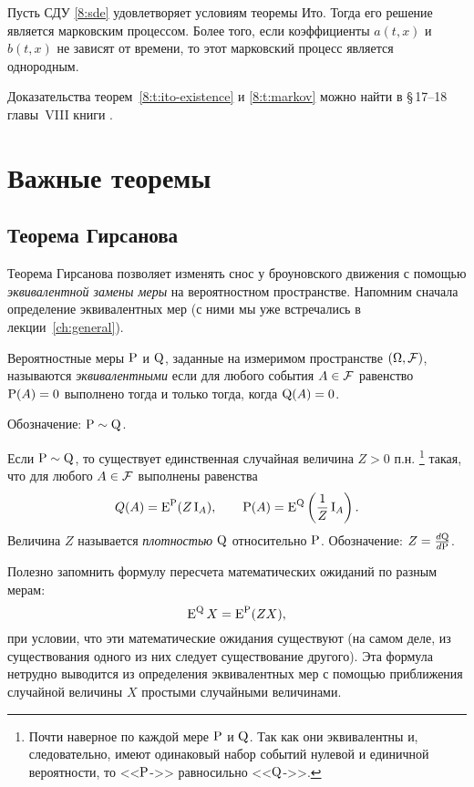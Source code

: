\begin{theorem}
\label{8:t:markov}
Пусть СДУ \eqref{8:sde} удовлетворяет условиям теоремы Ито.
Тогда его решение является марковским процессом.
Более того, если коэффициенты $a(t,x)$ и $b(t,x)$ не зависят от времени, то этот марковский процесс является однородным.
\end{theorem}

\noindent
Доказательства теорем~\ref{8:t:ito-existence} и \ref{8:t:markov} можно найти в \S\,17--18 главы~VIII книги \cite{BulinskiShiryaev04}.


\section{Важные теоремы}

\subsection{Теорема Гирсанова}
\label{ito-pr:ss:girsanov}
Теорема Гирсанова позволяет изменять снос у броуновского движения с помощью \emph{эквивалентной замены меры} на вероятностном пространстве. 
Напомним сначала определение эквивалентных мер (с ними мы уже встречались в лекции~\ref{ch:general}).

\begin{definition}
Вероятностные меры $\P$ и $\Q$, заданные на измеримом пространстве $(\Omega,\F)$, называются \emph{эквивалентными} если для любого события $A\in\F$ равенство $\P(A)=0$ выполнено тогда и только тогда, когда $\Q(A)=0$.

Обозначение: $\P\sim\Q$.
\end{definition}

\begin{proposition}
Если $\P\sim\Q$, то существует единственная случайная величина $Z>0$ п.н.%
\footnote{Почти наверное по каждой мере $\P$ и $\Q$.
Так как они эквивалентны и, следовательно, имеют одинаковый набор событий нулевой и единичной вероятности, то <<$\P$-\as>> равносильно <<$\Q$-\as>>.}
такая, что для любого $A\in \F$ выполнены равенства
\[
Q(A) = \E^{\P}(Z\I_A), \qquad \P(A) = \E^{\Q}\left(\frac{1}{Z}\I_A\right).
\]
Величина $Z$ называется \emph{плотностью} $\Q$ относительно $\P$. Обозначение: $Z = \frac{d\Q}{d\P}$.
\end{proposition}

Полезно запомнить формулу пересчета математических ожиданий по разным мерам:
\[
\E^{\Q} X = \E^{\P} (ZX),
\]
при условии, что эти математические ожидания существуют (на самом деле, из существования одного из них следует существование другого).
Эта формула нетрудно выводится из определения эквивалентных мер с помощью приближения случайной величины $X$ простыми случайными величинами.

